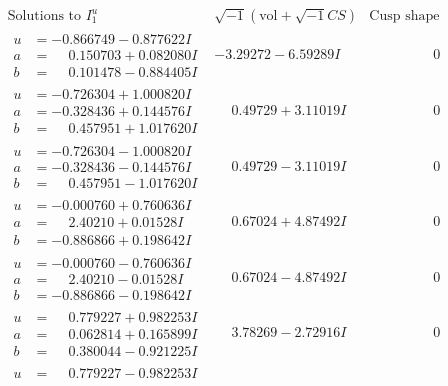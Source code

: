 \documentclass[1p]{elsarticle_modified}
\theoremstyle{definition}
\newcommand{\I}{\sqrt{-1}}
\begin{document}
$$\begin{array}{c|c|c}
\text{Solutions to }I^u_{1}& \I (\text{vol} + \sqrt{-1}CS) & \text{Cusp shape}\\
 \hline 
\begin{aligned}
u &= -0.866749 - 0.877622 I \\
a &= \phantom{-}0.150703 + 0.082080 I \\
b &= \phantom{-}0.101478 - 0.884405 I\end{aligned}
 & -3.29272 - 6.59289 I & \phantom{-0.000000 } 0 \\ \hline\begin{aligned}
u &= -0.726304 + 1.000820 I \\
a &= -0.328436 + 0.144576 I \\
b &= \phantom{-}0.457951 + 1.017620 I\end{aligned}
 & \phantom{-}0.49729 + 3.11019 I & \phantom{-0.000000 } 0 \\ \hline\begin{aligned}
u &= -0.726304 - 1.000820 I \\
a &= -0.328436 - 0.144576 I \\
b &= \phantom{-}0.457951 - 1.017620 I\end{aligned}
 & \phantom{-}0.49729 - 3.11019 I & \phantom{-0.000000 } 0 \\ \hline\begin{aligned}
u &= -0.000760 + 0.760636 I \\
a &= \phantom{-}2.40210 + 0.01528 I \\
b &= -0.886866 + 0.198642 I\end{aligned}
 & \phantom{-}0.67024 + 4.87492 I & \phantom{-0.000000 } 0 \\ \hline\begin{aligned}
u &= -0.000760 - 0.760636 I \\
a &= \phantom{-}2.40210 - 0.01528 I \\
b &= -0.886866 - 0.198642 I\end{aligned}
 & \phantom{-}0.67024 - 4.87492 I & \phantom{-0.000000 } 0 \\ \hline\begin{aligned}
u &= \phantom{-}0.779227 + 0.982253 I \\
a &= \phantom{-}0.062814 + 0.165899 I \\
b &= \phantom{-}0.380044 - 0.921225 I\end{aligned}
 & \phantom{-}3.78269 - 2.72916 I & \phantom{-0.000000 } 0 \\ \hline\begin{aligned}
u &= \phantom{-}0.779227 - 0.982253 I \\

\end{aligned}
\end{array}$$
\end{document}
